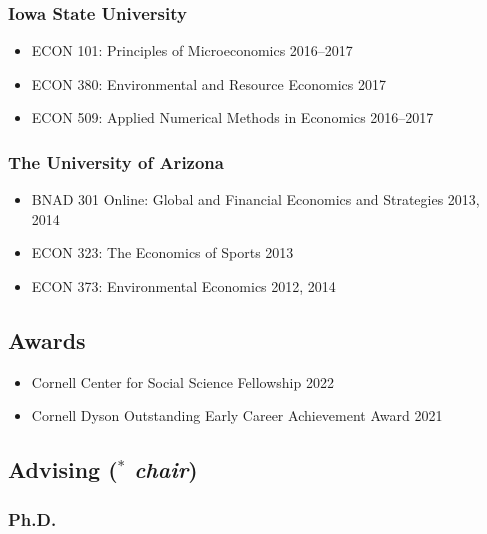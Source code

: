 \documentclass[12pt]{res} %
\begin{document}
\begin{resume}
\subsubsection{Iowa State University}
\begin{itemize} \itemsep -1pt
	\item[] ECON 101: Principles of Microeconomics \hfill 2016--2017
	\item[] ECON 380: Environmental and Resource Economics \hfill 2017
	\item[] ECON 509: Applied Numerical Methods in Economics \hfill 2016--2017
\end{itemize}\vspace{-.4in}
\subsubsection{The University of Arizona}
\begin{itemize} \itemsep -1pt %
	\item[] BNAD 301 Online: Global and Financial Economics and Strategies \hfill 2013, 2014
	\item[] ECON 323: The Economics of Sports \hfill 2013
	\item[] ECON 373: Environmental Economics \hfill 2012, 2014
\end{itemize}

\vspace{-.2in}

\subsection{Awards}
\begin{itemize}
	\item[] Cornell Center for Social Science Fellowship \hfill 2022
	\item[] Cornell Dyson Outstanding Early Career Achievement Award \hfill 2021
\end{itemize}

\vspace{-.2in}

\subsection{Advising ($^*$ \textit{chair})  }
\vspace{-.2in}

\subsubsection{Ph.D.}\vspace{-.2in}

\end{resume}
\end{document}
